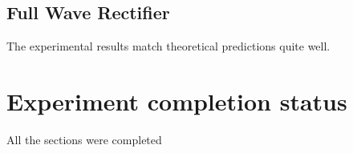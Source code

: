 \documentclass[12pt]{article}
\begin{document}
\subsection{Full Wave Rectifier}
\begin{figure}[H]
  \begin{center}
  \end{center}
\end{figure}
The experimental results match theoretical predictions quite well.

\section{Experiment completion status}
All the sections were completed
\end{document}
